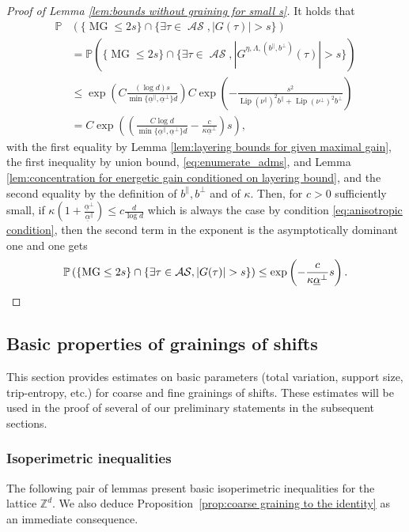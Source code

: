 \documentclass[11pt, reqno]{amsart}
\newcommand{\Z}{\mathbb{Z}}
\DeclareMathOperator{\lip}{Lip}
\DeclareMathOperator{\MG}{MG}
\DeclareMathOperator{\AS}{\mathcal{AS}}
\renewcommand{\P}{\mathbb{P}}
\numberwithin{equation}{section}
\begin{document}
\begin{proof}[Proof of Lemma \ref{lem:bounds without graining for small s}]
It holds that
\begin{align*}
\P&\left( \{\MG\leq 2s \} \cap \{\exists \tau \in \AS, |G(\tau)|> s \} \right)\\
&=\P \left( \{\MG\leq 2s \} \cap\{\exists \tau \in \AS, |G^{\eta,\Lambda,(b^{\parallel},b^{\perp})}(\tau)|> s \} \right)\\           
&\leq \exp \left(C 
\frac{(\log d) s}{\min \{\underline{\alpha}^{\parallel}, \underline{\alpha}^{\perp} \} d} \right) C\exp \left(-\frac{s^2}{ \lip(\nu^{\parallel})^{2} b^{\parallel} +
\lip(\nu^{\perp})^{2} b^{\perp} } \right) \\
&= C\exp \left( \left(\frac{C\log d}{\min \{\underline{\alpha}^{\parallel}, \underline{\alpha}^{\perp}\}d } - \frac{c }{\kappa \underline{\alpha}^{\perp}} 
\right)s \right),
\end{align*}
with the first equality by Lemma \ref{lem:layering bounds for given maximal gain}, the first inequality by union bound, \eqref{eq:enumerate_adms}, and Lemma \ref{lem:concentration for energetic gain conditioned on layering bound},
and the second equality by the definition of $b^{\parallel},b^{\perp}$ and of $\kappa$.
Then, for $c>0$ sufficiently small, if 
$\kappa \left(1+\frac{\underline{\alpha}^{\perp}} {\underline{\alpha}^{\parallel}}\right) \leq c \frac{d}{\log d }$
which is always the case by condition \eqref{eq:anisotropic condition},
then the second term in the exponent is the asymptotically dominant one and one gets 
\begin{equation*}
\P\left( \{\MG\leq 2s \} \cap \{\exists \tau \in \AS, |G(\tau)|> s \} \right)\leq \exp \left(-\frac{c}{\kappa \underline{\alpha}^{\perp}} s \right).   \qedhere\end{equation*}
\end{proof}
   
\subsection{Basic properties of grainings of shifts}\label{sec:basic properties of grainings of shifts}
This section provides estimates on basic parameters (total variation, support size, trip-entropy, etc.) for coarse and fine grainings of shifts. These estimates will be used in the proof of several of our preliminary statements in the subsequent sections. 

\subsubsection{Isoperimetric inequalities} The following pair of lemmas present basic isoperimetric inequalities for the lattice $\Z^d$. We also deduce Proposition~\ref{prop:coarse graining to the identity} as an immediate consequence.
\end{document}
